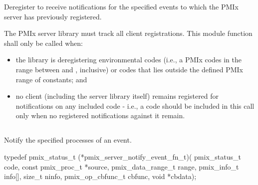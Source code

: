 \descr

Deregister to receive notifications for the specified events to which the \ac{PMIx} server has previously registered.

\adviceimplstart
The \ac{PMIx} server library must track all client registrations. This module function shall only be called when:

\begin{itemize}
    \item the library is deregistering environmental codes (i.e., a \ac{PMIx} codes in the range between  and , inclusive) or codes that lies outside the defined \ac{PMIx} range of constants; and
    \item no client (including the server library itself) remains registered for notifications on any included code - i.e., a code should be included in this call only when no registered notifications against it remain.
\end{itemize}

\adviceimplend


\subsection{}

\summary

Notify the specified processes of an event.

\format

\cspecificstart
\begin{codepar}
typedef pmix_status_t (*pmix_server_notify_event_fn_t)(
                             pmix_status_t code,
                             const pmix_proc_t *source,
                             pmix_data_range_t range,
                             pmix_info_t info[],
                             size_t ninfo,
                             pmix_op_cbfunc_t cbfunc,
                             void *cbdata);
\end{codepar}
\cspecificend

\begin{arglist}
\end{arglist}

